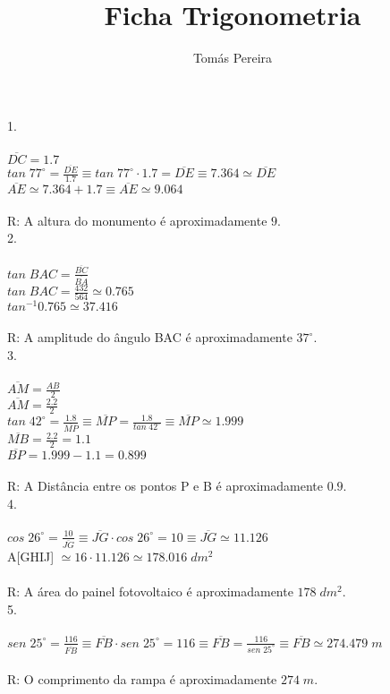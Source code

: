 \documentclass[12pt]{article}
\title{Ficha Trigonometria}
\author{Tomás Pereira}
\begin{document}
\maketitle

1.\\\\
$\overline{DC}=1.7$\\
$tan\;77^{\circ}=\frac{\overline{DE}}{1.7}\equiv tan\;77^{\circ}\cdot1.7=\overline{DE}\equiv7.364\simeq\overline{DE}$\\
$\overline{AE}\simeq7.364+1.7\equiv\overline{AE}\simeq9.064$\\\\
R: A altura do monumento é aproximadamente $9$.\\

2.\\\\
$tan\;BAC=\frac{\overline{BC}}{\overline{BA}}$\\
$tan\;BAC=\frac{432}{564}\simeq0.765$\\
$tan^{-1}0.765\simeq37.416$\\\\
R: A amplitude do ângulo BAC é aproximadamente $37^{\circ}$.\\

3.\\\\
$\overline{AM}=\frac{AB}{2}$\\
$\overline{AM}=\frac{2.2}{2}$\\
$tan\;42^{\circ}=\frac{1.8}{\overline{MP}}\equiv\overline{MP}=\frac{1.8}{tan\;42^{\circ}}\equiv\overline{MP}\simeq1.999$\\
$\overline{MB}=\frac{2.2}{2}=1.1$\\
$\overline{BP}=1.999-1.1=0.899$\\\\
R: A Distância entre os pontos P e B é aproximadamente $0.9$.\\

4.\\\\
$cos\;26^{\circ}=\frac{10}{\overline{JG}}\equiv\overline{JG}\cdot cos\;26^{\circ}=10\equiv\overline{JG}\simeq11.126$\\
A[GHIJ] $\simeq16\cdot11.126\simeq178.016\;dm^2$\\\\
R: A área do painel fotovoltaico é aproximadamente $178\;dm^2$.\\

5.\\\\
$sen\;25^{\circ}=\frac{116}{\overline{FB}}\equiv\overline{FB}\cdot sen\;25^{\circ}=116\equiv\overline{FB}=\frac{116}{sen\;25^{\circ}}\equiv\overline{FB}\simeq274.479\;m$\\\\
R: O comprimento da rampa é aproximadamente $274\;m$.\\
\end{document}
